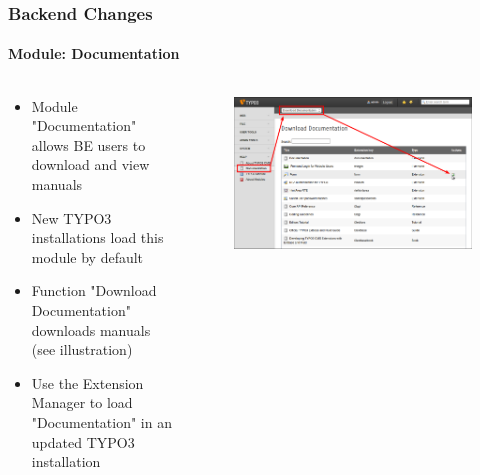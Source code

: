 \begin{frame}[fragile]
	\frametitle{Backend Changes}
	\framesubtitle{Module: Documentation}

	\begin{columns}[T]

		\begin{column}{.5\textwidth}
			\begin{itemize}
				\item Module "Documentation" allows BE users to download and view manuals
				\item New TYPO3 installations load this module by default
				\item Function "Download Documentation" downloads manuals (see illustration)
				\item Use the Extension Manager to load "Documentation" in an updated TYPO3 installation
			\end{itemize}
		\end{column}

		\begin{column}{.5\textwidth}
			\begin{figure}\vspace*{-0.4cm}
				\includegraphics[width=1\linewidth]{Images/BackendChanges/DownloadDocumentation.png}
			\end{figure}
		\end{column}

	\end{columns}

\end{frame}


